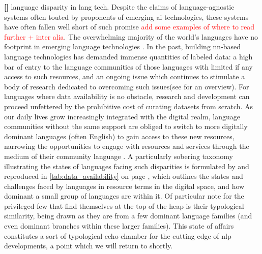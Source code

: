 \documentclass[thesis]{cluu}
\newcounter{paranum}
\newcommand{\numberedparagraph}{\par\refstepcounter{paranum}\textbf{[\theparanum] }}
\newcommand{\todo}[1]{\textcolor{red}{#1}}
\begin{document}
\numberedparagraph{language disparity in lang tech.} 
Despite the claims of language-agnostic systems often touted by proponents of emerging \gls{ai} technologies, these systems have often fallen well short of such promise \parencite{benderAchievingEvaluatingLanguageIndependence2011}\todo{add some examples of where to read further + inter alia}. The overwhelming majority of the world's languages have no footprint in emerging language technologies \parencite{joshiStateFateLinguistic2021}. In the past, building \gls{nn}-based language technologies has demanded immense quantities of labeled data: a high bar of entry to the language communities of those languages with limited if any access to such resources, and an ongoing issue which continues to stimulate a body of research dedicated to overcoming such issues(see \textcite{magueresseLowresourceLanguagesReview2020} for an overview). For languages where data availability is no obstacle, research and development can proceed unfettered by the prohibitive cost of curating datasets from scratch. As our daily lives grow increasingly integrated with the digital realm, language communities without the same support are obliged to switch to more digitally dominant languages (often English) to gain access to these new resources, narrowing the opportunities to engage with resources and services through the medium of their community language \parencite{nichasaideCanWeDefuse2019}. A particularly sobering taxonomy illustrating the states of languages facing such disparities is formulated by \textcite{joshiStateFateLinguistic2021} and reproduced in \cref{tab:data_availability} on page \pageref{tab:data_availability}, which outlines the states and challenges faced by languages in resource terms in the digital space, and how dominant a small group of languages are within it. Of particular note for the privileged few that find themselves at the top of the heap is their typological similarity, being drawn as they are from a few dominant language families (and even dominant branches within these larger families). This state of affairs constitutes a sort of typological echo-chamber for the cutting edge of \gls{nlp} developments, a point which we will return to shortly.
\end{document}

